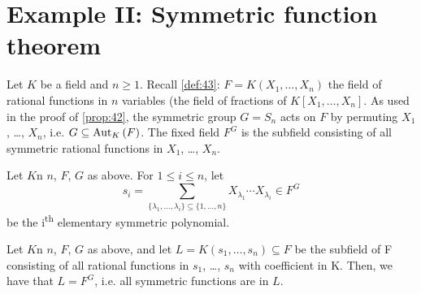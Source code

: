 
\section{Example II: Symmetric function theorem}
\label{sec:26}

Let $K$ be a field and $n \geq 1$. Recall \autoref{def:43}: $F = K(X_1, \ldots, X_n)$ the field of rational functions in $n$ variables (the field of fractions of $K[X_1, \ldots, X_n]$. As used in the proof of \autoref{prop:42}, the symmetric group $G = S_n$ acts on $F$ by permuting $X_1$, \ldots, $X_n$, i.e. $G \subseteq \autset[K]{F}$. The fixed field $F^G$ is the subfield consisting of all symmetric rational functions in $X_1$, \ldots, $X_n$.

\begin{definition}
  Let $K$n $n$, $F$, $G$ as above. For $1 \leq i \leq n$, let
\[
s_i = \sum_{\{\lambda_1, \ldots, \lambda_i\} \subseteq \{1, \ldots, n \}} X_{\lambda_1}\cdots{}X_{\lambda_i} \in F^G
\]
be the i\textsuperscript{th} elementary symmetric polynomial.
\end{definition}

\begin{proposition}
   Let $K$n $n$, $F$, $G$ as above, and let $L = K(s_1, \ldots, s_n) \subseteq F$ be the subfield of F consisting of all rational functions in $s_1$, \ldots, $s_n$ with coefficient in K. Then, we have that $L = F^G$, i.e. all symmetric functions are in $L$.
\end{proposition}

